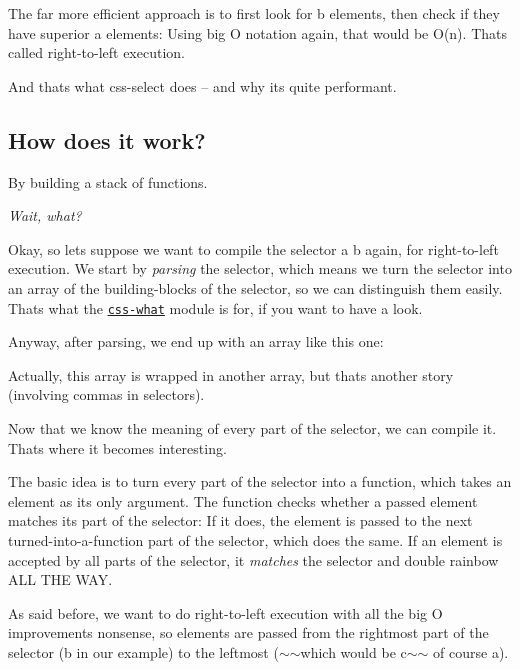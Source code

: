 The far more efficient approach is to first look for {\ttfamily b} elements, then check if they have superior {\ttfamily a} elements\+: Using big O notation again, that would be {\ttfamily O(n)}. That\textquotesingle{}s called right-\/to-\/left execution.

And that\textquotesingle{}s what css-\/select does – and why it\textquotesingle{}s quite performant.

\subsection*{How does it work?}

By building a stack of functions.

{\itshape Wait, what?}

Okay, so let\textquotesingle{}s suppose we want to compile the selector {\ttfamily a b} again, for right-\/to-\/left execution. We start by {\itshape parsing} the selector, which means we turn the selector into an array of the building-\/blocks of the selector, so we can distinguish them easily. That\textquotesingle{}s what the \href{https://github.com/fb55/css-what}{\tt {\ttfamily css-\/what}} module is for, if you want to have a look.

Anyway, after parsing, we end up with an array like this one\+:


\begin{DoxyCode}
\end{DoxyCode}


Actually, this array is wrapped in another array, but that\textquotesingle{}s another story (involving commas in selectors).

Now that we know the meaning of every part of the selector, we can compile it. That\textquotesingle{}s where it becomes interesting.

The basic idea is to turn every part of the selector into a function, which takes an element as its only argument. The function checks whether a passed element matches its part of the selector\+: If it does, the element is passed to the next turned-\/into-\/a-\/function part of the selector, which does the same. If an element is accepted by all parts of the selector, it {\itshape matches} the selector and double rainbow A\+LL T\+HE W\+AY.

As said before, we want to do right-\/to-\/left execution with all the big O improvements nonsense, so elements are passed from the rightmost part of the selector ({\ttfamily b} in our example) to the leftmost ($\sim$$\sim$which would be {\ttfamily c}$\sim$$\sim$ of course {\ttfamily a}).

